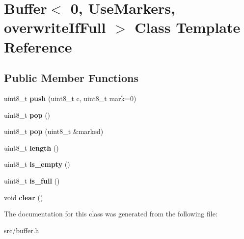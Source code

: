 \hypertarget{classBuffer_3_010_00_01UseMarkers_00_01overwriteIfFull_01_4}{}\section{Buffer$<$ 0, Use\+Markers, overwrite\+If\+Full $>$ Class Template Reference}
\label{classBuffer_3_010_00_01UseMarkers_00_01overwriteIfFull_01_4}
\subsection*{Public Member Functions}
\begin{DoxyCompactItemize}
\item 
\hypertarget{classBuffer_3_010_00_01UseMarkers_00_01overwriteIfFull_01_4_a462a4efa861532f102a2629bddb98286}{}\label{classBuffer_3_010_00_01UseMarkers_00_01overwriteIfFull_01_4_a462a4efa861532f102a2629bddb98286} 
uint8\+\_\+t {\bfseries push} (uint8\+\_\+t c, uint8\+\_\+t mark=0)
\item 
\hypertarget{classBuffer_3_010_00_01UseMarkers_00_01overwriteIfFull_01_4_a2a401dd63d1fef6e4482d2beeeb2cb58}{}\label{classBuffer_3_010_00_01UseMarkers_00_01overwriteIfFull_01_4_a2a401dd63d1fef6e4482d2beeeb2cb58} 
uint8\+\_\+t {\bfseries pop} ()
\item 
\hypertarget{classBuffer_3_010_00_01UseMarkers_00_01overwriteIfFull_01_4_a89f41cf01211b523f3c41e39415e40fd}{}\label{classBuffer_3_010_00_01UseMarkers_00_01overwriteIfFull_01_4_a89f41cf01211b523f3c41e39415e40fd} 
uint8\+\_\+t {\bfseries pop} (uint8\+\_\+t \&marked)
\item 
\hypertarget{classBuffer_3_010_00_01UseMarkers_00_01overwriteIfFull_01_4_ab420cb9bc314366ab5288b9cbe46f22f}{}\label{classBuffer_3_010_00_01UseMarkers_00_01overwriteIfFull_01_4_ab420cb9bc314366ab5288b9cbe46f22f} 
uint8\+\_\+t {\bfseries length} ()
\item 
\hypertarget{classBuffer_3_010_00_01UseMarkers_00_01overwriteIfFull_01_4_ac6d91d70dcab25fdf0bb88c9ae9912ce}{}\label{classBuffer_3_010_00_01UseMarkers_00_01overwriteIfFull_01_4_ac6d91d70dcab25fdf0bb88c9ae9912ce} 
uint8\+\_\+t {\bfseries is\+\_\+empty} ()
\item 
\hypertarget{classBuffer_3_010_00_01UseMarkers_00_01overwriteIfFull_01_4_aa9f7cd8915684dbb2f334afe79df9e81}{}\label{classBuffer_3_010_00_01UseMarkers_00_01overwriteIfFull_01_4_aa9f7cd8915684dbb2f334afe79df9e81} 
uint8\+\_\+t {\bfseries is\+\_\+full} ()
\item 
\hypertarget{classBuffer_3_010_00_01UseMarkers_00_01overwriteIfFull_01_4_a2b4c2ceff500dd7df0c2d1b3f05c47ab}{}\label{classBuffer_3_010_00_01UseMarkers_00_01overwriteIfFull_01_4_a2b4c2ceff500dd7df0c2d1b3f05c47ab} 
void {\bfseries clear} ()
\end{DoxyCompactItemize}


The documentation for this class was generated from the following file\+:\begin{DoxyCompactItemize}
\item 
src/buffer.\+h\end{DoxyCompactItemize}
